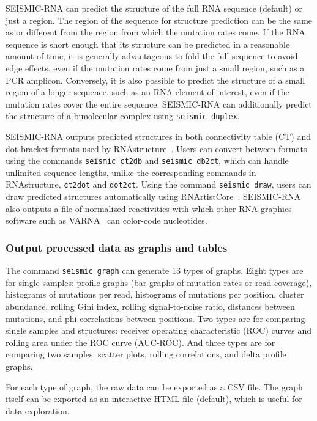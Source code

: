 \documentclass[unnumsec,webpdf,contemporary,large]{oup-authoring-template}%
\theoremstyle{thmstyleone}%
\theoremstyle{thmstyletwo}%
\theoremstyle{thmstylethree}%
\begin{document}
SEISMIC-RNA can predict the structure of the full RNA sequence (default) or just a region.
The region of the sequence for structure prediction can be the same as or different from the region from which the mutation rates come.
If the RNA sequence is short enough that its structure can be predicted in a reasonable amount of time, it is generally advantageous to fold the full sequence to avoid edge effects, even if the mutation rates come from just a small region, such as a PCR amplicon.
Conversely, it is also possible to predict the structure of a small region of a longer sequence, such as an RNA element of interest, even if the mutation rates cover the entire sequence.
SEISMIC-RNA can additionally predict the structure of a bimolecular complex using \verb|seismic duplex|.

SEISMIC-RNA outputs predicted structures in both connectivity table (CT) and dot-bracket formats used by RNAstructure~\cite{Reuter2010}.
Users can convert between formats using the commands \verb|seismic ct2db| and \verb|seismic db2ct|, which can handle unlimited sequence lengths, unlike the corresponding commands in RNAstructure, \verb|ct2dot| and \verb|dot2ct|.
Using the command \verb|seismic draw|, users can draw predicted structures automatically using RNArtistCore~\cite{RNArtistCore}.
SEISMIC-RNA also outputs a file of normalized reactivities with which other RNA graphics software such as VARNA~\cite{Darty2009} can color-code nucleotides.

\subsubsection{Output processed data as graphs and tables}

The command \verb|seismic graph| can generate 13 types of graphs.
Eight types are for single samples: profile graphs (bar graphs of mutation rates or read coverage), histograms of mutations per read, histograms of mutations per position, cluster abundance, rolling Gini index, rolling signal-to-noise ratio, distances between mutations, and phi correlations between positions.
Two types are for comparing single samples and structures: receiver operating characteristic (ROC) curves and rolling area under the ROC curve (AUC-ROC).
And three types are for comparing two samples: scatter plots, rolling correlations, and delta profile graphs.

For each type of graph, the raw data can be exported as a CSV file.
The graph itself can be exported as an interactive HTML file (default), which is useful for data exploration.
\end{document}
